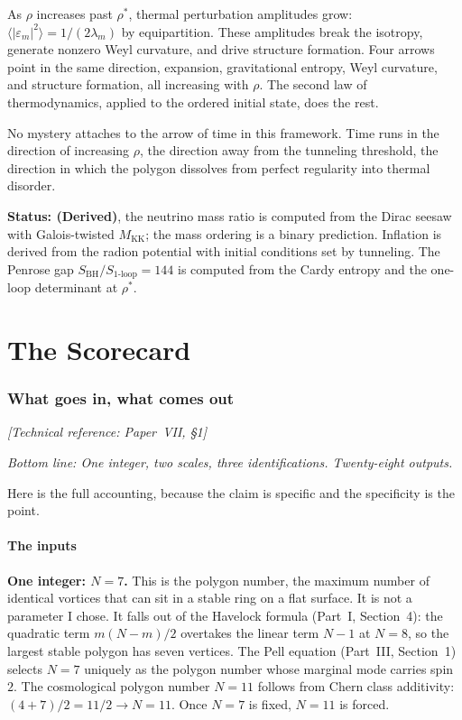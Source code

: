 As $\rho$ increases past $\rho^*$, thermal perturbation amplitudes
grow: $\langle|\varepsilon_m|^2\rangle = 1/(2\lambda_m)$ by
equipartition. These amplitudes break the isotropy, generate nonzero
Weyl curvature, and drive structure formation. Four arrows point in
the same direction, expansion, gravitational entropy, Weyl curvature,
and structure formation, all increasing with $\rho$. The second law of
thermodynamics, applied to the ordered initial state, does the rest.

No mystery attaches to the arrow of time in this framework. Time runs in
the direction of increasing $\rho$, the direction away from the
tunneling threshold, the direction in which the polygon dissolves from
perfect regularity into thermal disorder.

\textbf{Status: (Derived)}, the neutrino mass ratio is computed from
the Dirac seesaw with Galois-twisted $M_{\mathrm{KK}}$; the mass
ordering is a binary prediction. Inflation is derived from the radion
potential with initial conditions set by tunneling. The Penrose gap
$S_{\mathrm{BH}}/S_{\mathrm{1\text{-}loop}} = 144$ is computed from
the Cardy entropy and the one-loop determinant at $\rho^*$.


\part{The Scorecard}


\section{What goes in, what comes out}
\noindent\textit{[Technical reference: Paper~VII, \S1]}

\medskip

\noindent\textit{Bottom line: One integer, two scales, three
identifications. Twenty-eight outputs.}

\medskip

Here is the full accounting, because the claim is specific
and the specificity is the point.

\subsection*{The inputs}

\textbf{One integer: $N = 7$.} This is the polygon number, the
maximum number of identical vortices that can sit in a stable ring on a
flat surface. It is not a parameter I chose. It falls out of the
Havelock formula (Part~I, Section~4): the quadratic term $m(N-m)/2$
overtakes the linear term $N - 1$ at $N = 8$, so the largest stable
polygon has seven vertices. The Pell equation (Part~III, Section~1)
selects $N = 7$ uniquely as the polygon number whose marginal mode
carries spin~$2$. The cosmological polygon number $N = 11$ follows from
Chern class additivity: $(4 + 7)/2 = 11/2 \to N = 11$. Once $N = 7$ is
fixed, $N = 11$ is forced.

